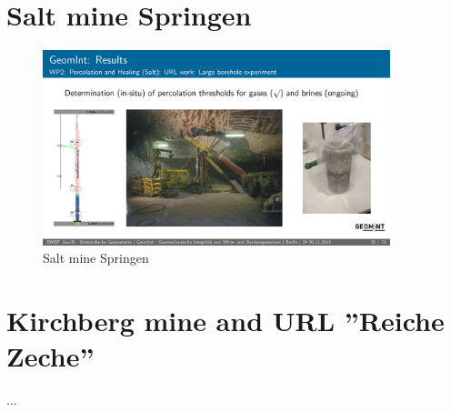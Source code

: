 \section{Salt mine Springen}

\begin{figure}
\includegraphics[width=0.9\textwidth]{figures/geomint-springen.png}
\caption{Salt mine Springen}
\label{fig:geomint-exp}
\end{figure}

\section{Kirchberg mine and URL ''Reiche Zeche''}

\begin{list}{-}{\leftmargin=1em \itemindent=0em \itemsep=0.2em}
\item ...
\end{list}
